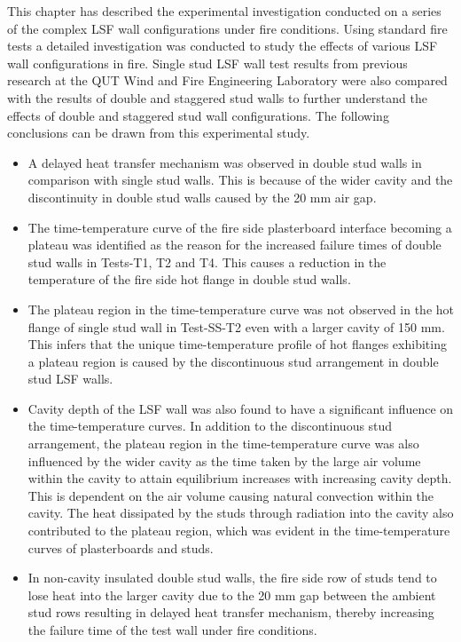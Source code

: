 This chapter has described the experimental investigation conducted on a series of the complex LSF wall configurations under fire conditions. Using standard fire tests a detailed investigation was conducted to study the effects of various LSF wall configurations in fire. Single stud LSF wall test results from previous research at the QUT Wind and Fire Engineering Laboratory were also compared with the results of double and staggered stud walls to further understand the effects of double and staggered stud wall configurations. The following conclusions can be drawn from this experimental study.
\begin{itemize}
	\item A delayed heat transfer mechanism was observed in double stud walls in comparison with single stud walls. This is because of the wider cavity and the discontinuity in double stud walls caused by the 20 mm air gap. 
	\item The time-temperature curve of the fire side plasterboard interface becoming a plateau was identified as the reason for the increased failure times of double stud walls in Tests-T1, T2 and T4. This causes a reduction in the temperature of the fire side hot flange in double stud walls. 
	\item The plateau region in the time-temperature curve was not observed in the hot flange of single stud wall in Test-SS-T2 even with a larger cavity of 150 mm. This infers that the unique time-temperature profile of hot flanges exhibiting a plateau region is caused by the discontinuous stud arrangement in double stud LSF walls.
	\item Cavity depth of the LSF wall was also found to have a significant influence on the time-temperature curves. In addition to the discontinuous stud arrangement, the plateau region in the time-temperature curve was also influenced by the wider cavity as the time taken by the large air volume within the cavity to attain equilibrium increases with increasing cavity depth. This is dependent on the air volume causing natural convection within the cavity. The heat dissipated by the studs through radiation into the cavity also contributed to the plateau region, which was evident in the time-temperature curves of plasterboards and studs.
	\item In non-cavity insulated double stud walls, the fire side row of studs tend to lose heat into the larger cavity due to the 20 mm gap between the ambient stud rows resulting in delayed heat transfer mechanism, thereby increasing the failure time of the test wall under fire conditions. 

\end{itemize}
